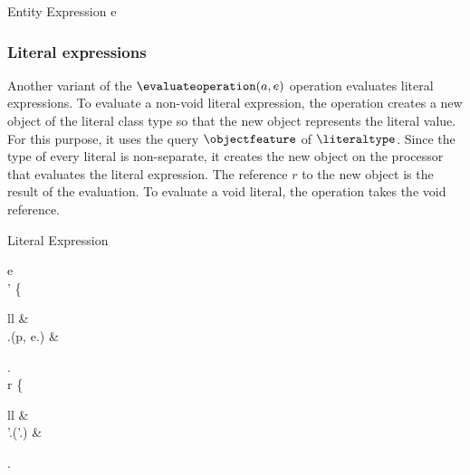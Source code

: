 \singlelineinferencerule
	{Entity Expression}
	{
		e \in \entitytype \\
	}
	{}
	{}
 
\subsubsection{Literal expressions}
Another variant of the $\evaluateoperation(a, e)$ operation evaluates literal expressions. To evaluate a non-void literal expression, the operation creates a new object of the literal class type so that the new object represents the literal value. For this purpose, it uses the query $\objectfeature$ of $\literaltype$. Since the type of every literal is non-separate, it creates the new object on the processor that evaluates the literal expression. The reference $r$ to the new object is the result of the evaluation. To evaluate a void literal, the operation takes the void reference.

\singlelineinferencerule
	{Literal Expression}
	{
		e \in \literaltype \\
		\state' \mathematicaldefinition
			\left\{
				\begin{array}{ll}
					 \state &  \\
					 \state.\addobjectfeature(p, e.\objectfeature) & \otherwisecondition
				\end{array}
			\right. \\
		r \mathematicaldefinition
			\left\{
				\begin{array}{ll}
					 \voidvalue & \condition{e = \voidliteral} \\
					 \state'.(\state'.\lastaddedobjectfeature) & \otherwisecondition
				\end{array}
			\right.
	}
	{}
	{}
 
